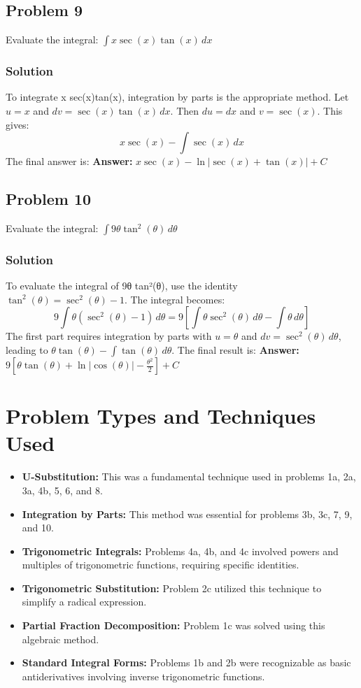 \documentclass{article}
\begin{document}
\subsection{Problem 9}
Evaluate the integral: $ \int x \sec(x)\tan(x) \,dx $
\subsubsection*{Solution}
To integrate x sec(x)tan(x), integration by parts is the appropriate method. Let $ u = x $ and $ dv = \sec(x)\tan(x) \,dx $. Then $ du = dx $ and $ v = \sec(x) $. This gives:
\[ x\sec(x) - \int \sec(x) \,dx \]
The final answer is:
\textbf{Answer:} $ x\sec(x) - \ln|\sec(x)+\tan(x)| + C $


\subsection{Problem 10}
Evaluate the integral: $ \int 9\theta \tan^2(\theta) \,d\theta $
\subsubsection*{Solution}
To evaluate the integral of 9θ tan²(θ), use the identity $ \tan^2(\theta) = \sec^2(\theta) - 1 $. The integral becomes:
\[ 9 \int \theta(\sec^2(\theta)-1) \,d\theta = 9\left[\int \theta\sec^2(\theta) \,d\theta - \int \theta \,d\theta\right] \]
The first part requires integration by parts with $ u = \theta $ and $ dv = \sec^2(\theta) \,d\theta $, leading to $ \theta\tan(\theta) - \int \tan(\theta) \,d\theta $. The final result is:
\textbf{Answer:} $ 9\left[\theta\tan(\theta) + \ln|\cos(\theta)| - \frac{\theta^2}{2}\right] + C $


\section{Problem Types and Techniques Used}
\begin{itemize}
    \item \textbf{U-Substitution:} This was a fundamental technique used in problems 1a, 2a, 3a, 4b, 5, 6, and 8.
    \item \textbf{Integration by Parts:} This method was essential for problems 3b, 3c, 7, 9, and 10.
    \item \textbf{Trigonometric Integrals:} Problems 4a, 4b, and 4c involved powers and multiples of trigonometric functions, requiring specific identities.
    \item \textbf{Trigonometric Substitution:} Problem 2c utilized this technique to simplify a radical expression.
    \item \textbf{Partial Fraction Decomposition:} Problem 1c was solved using this algebraic method.
    \item \textbf{Standard Integral Forms:} Problems 1b and 2b were recognizable as basic antiderivatives involving inverse trigonometric functions.
\end{itemize}
\end{document}
